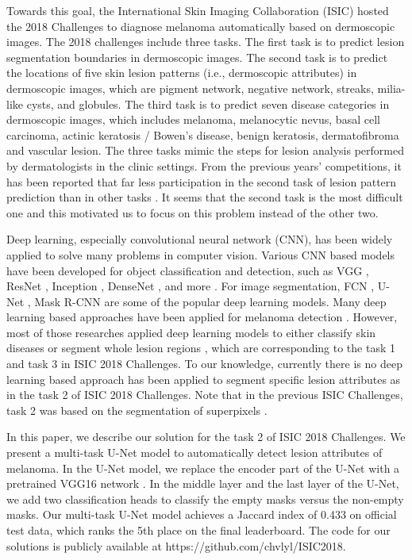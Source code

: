 \documentclass{article}
\begin{document}
Towards this goal, the International Skin Imaging Collaboration (ISIC) hosted the 2018 Challenges to diagnose melanoma automatically based on dermoscopic images. The 2018 challenges include three tasks. The first task is to predict lesion segmentation boundaries in dermoscopic images. The second task is to predict the locations of five skin lesion patterns (i.e., dermoscopic attributes) in dermoscopic images, which are pigment network, negative network, streaks, milia-like cysts, and globules. The third task is to predict seven disease categories in dermoscopic images, which includes melanoma, melanocytic nevus, basal cell carcinoma, actinic keratosis / Bowen’s disease, benign keratosis, dermatofibroma and vascular lesion. The three tasks mimic the steps for lesion analysis performed by dermatologists in the clinic settings.  From the previous years' competitions, it has been reported that far less participation in the second task of lesion pattern prediction than in other tasks \cite{codella2018skin}. It seems that the second task is the most difficult one and this motivated us to focus on this problem instead of the other two. 

Deep learning, especially convolutional neural network (CNN), has been widely applied to solve many problems in computer vision. Various CNN based models have been developed for object classification and detection, such as VGG \cite{simonyan2014very}, ResNet \cite{he2016deep}, Inception \cite{szegedy2017inception}, DenseNet \cite{huang2017densely}, and more \cite{liu2017survey}. For image segmentation, FCN \cite{long2015fully}, U-Net \cite{ronneberger2015u}, Mask R-CNN \cite{he2017mask} are some of the popular deep learning models.  Many deep learning based approaches have been applied for melanoma detection \cite{mishra2016overview}. However, most of those researches applied deep learning models to either classify skin diseases \cite{haenssle2018man, yu2018acral} or segment whole lesion regions \cite{zhang2017melanoma}, which are corresponding to the task 1 and task 3 in ISIC 2018 Challenges. To our knowledge, currently there is no deep learning based approach has been applied to segment specific lesion attributes as in the task 2 of ISIC 2018 Challenges. Note that in the previous ISIC Challenges, task 2 was based on the segmentation of superpixels \cite{codella2018skin}.   

In this paper, we describe our solution for the task 2 of ISIC 2018 Challenges. We present a multi-task U-Net model to automatically detect lesion attributes of melanoma. In the U-Net model, we replace the encoder part of the U-Net with a pretrained VGG16 network \cite{shvets2018automatic}. In the middle layer and the last layer of the U-Net, we add two classification heads to classify the empty masks versus the non-empty masks.  Our multi-task U-Net model achieves a Jaccard index of 0.433 on official test data, which ranks the 5th place on the final leaderboard. The code for our solutions is publicly available at https://github.com/chvlyl/ISIC2018. 
\end{document}
